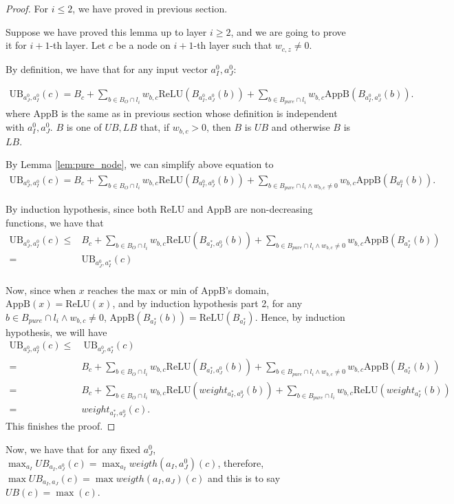 \documentclass[]{article}
\theoremstyle{definition}
\newcommand{\ReLU}{\mathrm{ReLU}}
\begin{document}
\begin{proof}
	
	For $i\leq 2$, we have proved in previous section.
	
	Suppose we have proved this lemma up to layer $i\geq 2$, and we are going to prove it for $i+1$-th layer. Let $c$ be a node on $i+1$-th layer such that $w_{c,z}\neq 0$.
	
	By definition, we have that for any input vector $a^0_I,a^0_J$:
	
	\begin{align*}
		\mathrm{UB}_{a^0_J,a^0_I}(c) = B_c + \sum_{b\in B_O\cap l_i} w_{b,c}\ReLU(B_{a^0_I,a^0_J}(b)) + \sum_{b\in B_{pure}\cap l_{i}} w_{b,c} \mathrm{AppB}(B_{a^0_I,a^0_J}(b)).
	\end{align*} where $\mathrm{AppB}$ is the same as in previous section  whose definition is independent with $a^0_I,a^0_J$. $B$ is one of $UB,LB$  that, if $w_{b,c}>0$, then $B$ is $UB$ and otherwise $B$ is $LB$.
	
	By Lemma \ref{lem:pure_node}, we can simplify above equation to \begin{align*}
			\mathrm{UB}_{a^0_J,a^0_I}(c) = B_c + \sum_{b\in B_O\cap l_i} w_{b,c}\ReLU(B_{a^0_I,a^0_J}(b)) + \sum_{b\in B_{pure}\cap l_{i}\wedge w_{b,c}\neq 0} w_{b,c} \mathrm{AppB}(B_{a^0_I}(b)).
	\end{align*}
	
	By induction hypothesis, since both $\ReLU$ and $\mathrm{AppB}$ are non-decreasing functions, we have that \begin{align*}
		\mathrm{UB}_{a^0_J,a^0_I}(c)\leq 
		 &B_c + \sum_{b\in B_O\cap l_i} w_{b,c}\ReLU(B_{a^*_I,a^0_J}(b)) + \sum_{b\in B_{pure}\cap l_{i}\wedge w_{b,c}\neq 0} w_{b,c} \mathrm{AppB}(B_{a^*_I}(b))\\
		= & \mathrm{UB}_{a^0_J,a^*_I}(c) \\
	\end{align*} 
	
Now, since when $x$ reaches the max or min of $\mathrm{AppB}$'s domain, $\mathrm{AppB}(x)=\ReLU(x)$, and by induction hypothesis part 2, for any $b\in B_{pure}\cap l_i\wedge w_{b,c}\neq 0$, $\mathrm{AppB}(B_{a^*_I}(b))=\ReLU(B_{a^*_I})$. Hence, by induction hypothesis, we will have \begin{align*}
	\mathrm{UB}_{a^0_J,a^0_I}(c)\leq & \ \mathrm{UB}_{a^0_J,a^*_I}(c) \\
	= &B_c + \sum_{b\in B_O\cap l_i} w_{b,c}\ReLU(B_{a^*_I,a^0_J}(b)) + \sum_{b\in B_{pure}\cap l_{i}\wedge w_{b,c}\neq 0} w_{b,c} \mathrm{AppB}(B_{a^*_I}(b))\\
	= &B_c + \sum_{b\in B_O\cap l_i} w_{b,c}\ReLU(weight_{a^*_I,a^0_J}(b)) + \sum_{b\in B_{pure}\cap l_{i}} w_{b,c} \mathrm{ReLU}(weight_{a^*_I}(b))\\
	= & weight_{a^*_I,a^0_J}(c).
\end{align*} This finishes the proof.
	\end{proof}


Now, we have that for any fixed $a^0_J$, $\max_{a_I} UB_{a_I,a^0_J}(c)= \max_{a_I} weigth(a_I,a^0_J)(c)$, therefore, $\max UB_{a_I,a_J}(c)= \max weigth(a_I,a_J)(c)$ and this is to say $UB(c)=\max(c)$.
\end{document}
